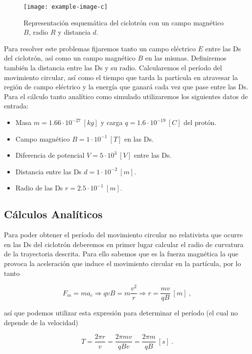 \documentclass[journal]{IEEEtran}
\begin{document}
\begin{figure}[!htb]
    \texttt{[image: example-image-c]}
    \caption{Representación esquemática del ciclotrón con un campo magnético $B$, radio $R$ y distancia $d$.}
    \label{fig:ciclotron}
\end{figure}

Para resolver este problemas fijaremos tanto un campo eléctrico $E$ entre las Ds del ciclotrón, así como un campo magnético $B$ en las mismas. Definiremos también la distancia entre las Ds y su radio. Calcularemos el período del movimiento circular, así como el tiempo que tarda la partícula en atravesar la región de campo eléctrico y la energía que ganará cada vez que pase entre las Ds. Para el cálculo tanto analítico como simulado utilizaremos los siguientes datos de entrada:

\begin{itemize}
    \item Masa $m = 1.66\cdot 10^{-27}~[kg]$ y carga $q = 1.6\cdot 10^{-19}~[C]$ del protón.
    \item Campo magnético $B = 1\cdot 10^{-1}~[T]$ en las Ds.
    \item Diferencia de potencial $V = 5\cdot 10^3~[V]$ entre las Ds.
    \item Distancia entre las Ds $d = 1\cdot 10^{-2}~[m]$.
    \item Radio de las Ds $r = 2.5\cdot 10^{-1}~[m]$.
\end{itemize}

\newpage

\subsection{Cálculos Analíticos}

Para poder obtener el período del movimiento circular no relativista que ocurre en las Ds del ciclotrón deberemos en primer lugar calcular el radio de curvatura de la trayectoria descrita. Para ello sabemos que es la fuerza magnética la que provoca la aceleración que induce el movimiento circular en la partícula, por lo tanto

\begin{equation}
F_m = ma_c \Rightarrow qvB = m \displaystyle\frac{v^2}{r} \Rightarrow r = \displaystyle\frac{mv}{qB}~[m]~,
\end{equation}

así que podemos utilizar esta expresión para determinar el período (el cual no depende de la velocidad)

\begin{equation}
T = \displaystyle\frac{2\pi r}{v} = \displaystyle\frac{2\pi mv}{qBv} = \displaystyle\frac{2\pi m}{qB}~[s]~.
\end{equation}
\end{document}
